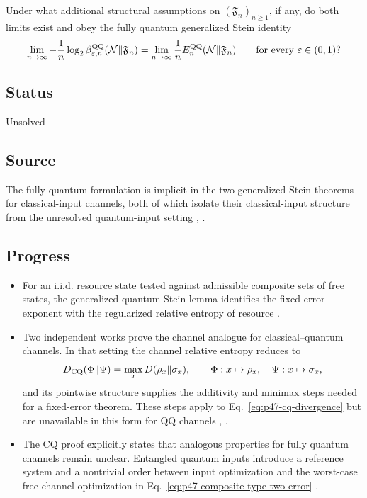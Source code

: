Under what additional structural assumptions on $(\mathfrak F_n)_{n\geq1}$,
if any, do both limits exist and obey the fully quantum generalized Stein
identity
\begin{equation}
  \lim_{n\to\infty}-\frac1n\log_2
  \beta_{\varepsilon,n}^{\rm QQ}(\mathcal N\|\mathfrak F_n)
  =\lim_{n\to\infty}\frac1n
  E_n^{\rm QQ}(\mathcal N\|\mathfrak F_n)
  \qquad\text{for every }\varepsilon\in(0,1)?
  \label{eq:p47-fully-quantum-stein}
\end{equation}

\subsection*{Status}

Unsolved

\subsection*{Source}

The fully quantum formulation is implicit in the two generalized Stein
theorems for classical-input channels, both of which isolate their
classical-input structure from the unresolved quantum-input setting
,
.

\subsection*{Progress}

\begin{itemize}
  \item For an i.i.d. resource state tested against admissible composite sets
  of free states, the generalized quantum Stein lemma identifies the
  fixed-error exponent with the regularized relative entropy of resource
  .

  \item Two independent works prove the channel analogue for
  classical--quantum channels.  In that setting the channel relative entropy
  reduces to
  \begin{equation}
    D_{\rm CQ}(\Phi\|\Psi)=\max_x D(\rho_x\|\sigma_x),
    \qquad \Phi:x\mapsto\rho_x,\quad\Psi:x\mapsto\sigma_x,
    \label{eq:p47-cq-divergence}
  \end{equation}
  and its pointwise structure supplies the additivity and minimax steps needed
  for a fixed-error theorem.  These steps apply to
  Eq.~\eqref{eq:p47-cq-divergence} but are unavailable in this form for QQ
  channels
  ,
  .

  \item The CQ proof explicitly states that analogous properties for fully
  quantum channels remain unclear.  Entangled quantum inputs introduce a
  reference system and a nontrivial order between input optimization and the
  worst-case free-channel optimization in
  Eq.~\eqref{eq:p47-composite-type-two-error}
  .
\end{itemize}


